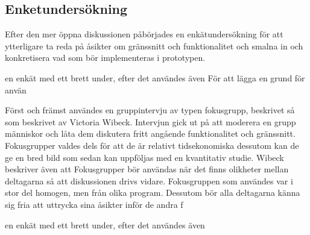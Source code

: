 \subsection{Enketundersökning}

Efter den mer öppna diskussionen påbörjades en enkätundersökning för att ytterligare ta reda på åsikter om gränssnitt och funktionalitet och smalna in och konkretisera vad som bör implementeras i prototypen.

en enkät med ett brett under, efter det användes även
För att lägga en grund för använ

Först och främst användes en gruppintervju av typen fokusgrupp, beskrivet så som beskrivet av Victoria Wibeck.\cite{wibeck} Intervjun gick ut på att moderera en grupp människor och låta dem diskutera fritt angående funktionalitet och gränssnitt. Fokusgrupper valdes dels för att de är relativt tidsekonomiska dessutom kan de ge en bred bild som sedan kan uppföljas med en kvantitativ studie. \cite{wibeck} Wibeck beskriver även att Fokusgrupper bör användas när det finns olikheter mellan deltagarna så att diskussionen drivs vidare. Fokusgruppen som användes var i stor del homogen, men från olika program. Dessutom bör alla deltagarna känna sig fria att uttrycka sina åsikter inför de andra f

en enkät med ett brett under, efter det användes även
